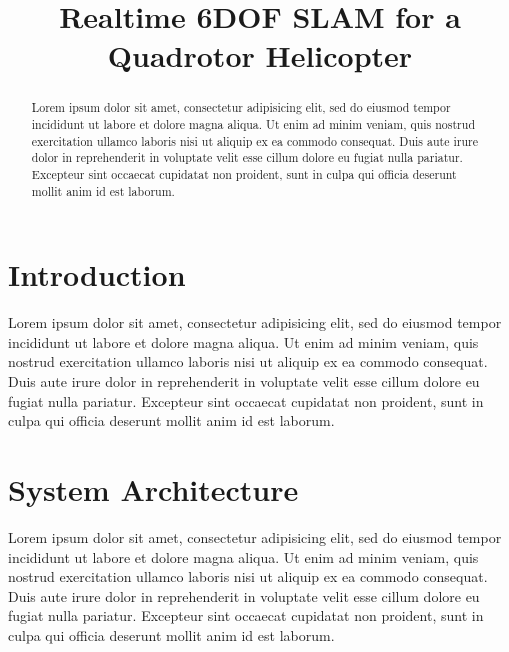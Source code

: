 \documentclass[conference]{IEEEtran}
\title{Realtime 6DOF SLAM for a Quadrotor Helicopter}
\author{\IEEEauthorblockN{Stephen Chaves}
  \and
  \IEEEauthorblockN{Schuyler Cohen}
  \and
  \IEEEauthorblockN{Patrick O'Keefe}
  \and
  \IEEEauthorblockN{Paul Ozog}}
\begin{document}
\maketitle



\begin{abstract}
  Lorem ipsum dolor sit amet, consectetur adipisicing elit, sed do eiusmod tempor incididunt
  ut labore et dolore magna aliqua. Ut enim ad minim veniam, quis nostrud exercitation
  ullamco laboris nisi ut aliquip ex ea commodo consequat. Duis aute irure dolor in
  reprehenderit in voluptate velit esse cillum dolore eu fugiat nulla pariatur. Excepteur
  sint occaecat cupidatat non proident, sunt in culpa qui officia deserunt mollit anim id
  est laborum.
\end{abstract}






\section{Introduction}
\label{sec:introduction}


Lorem ipsum dolor sit amet, consectetur adipisicing elit, sed do eiusmod tempor incididunt
ut labore et dolore magna aliqua. Ut enim ad minim veniam, quis nostrud exercitation
ullamco laboris nisi ut aliquip ex ea commodo consequat. Duis aute irure dolor in
reprehenderit in voluptate velit esse cillum dolore eu fugiat nulla pariatur. Excepteur
sint occaecat cupidatat non proident, sunt in culpa qui officia deserunt mollit anim id
est laborum.




\section*{System Architecture}
\label{sec:systemarchitecture}


Lorem ipsum dolor sit amet, consectetur adipisicing elit, sed do eiusmod tempor incididunt
ut labore et dolore magna aliqua. Ut enim ad minim veniam, quis nostrud exercitation
ullamco laboris nisi ut aliquip ex ea commodo consequat. Duis aute irure dolor in
reprehenderit in voluptate velit esse cillum dolore eu fugiat nulla pariatur. Excepteur
sint occaecat cupidatat non proident, sunt in culpa qui officia deserunt mollit anim id
est laborum.
\end{document}
